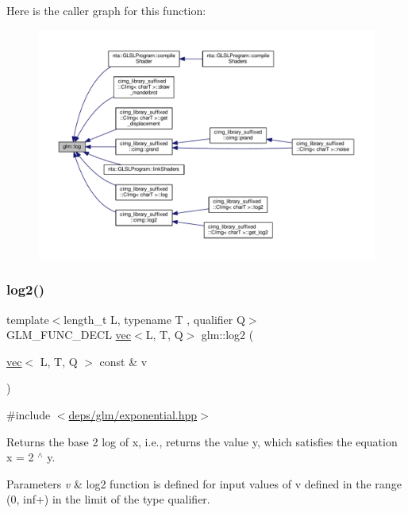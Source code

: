 Here is the caller graph for this function\+:
\nopagebreak
\begin{figure}[H]
\begin{center}
\leavevmode
\includegraphics[width=350pt]{df/d74/group__core__func__exponential_ga918c9f3fd086ce20e6760c903bd30fa9_icgraph}
\end{center}
\end{figure}
\mbox{\label{group__core__func__exponential_ga82831c7d9cca777cebedfe03a19c8d75}} 
\subsubsection{\texorpdfstring{log2()}{log2()}}
{\footnotesize\ttfamily template$<$length\+\_\+t L, typename T , qualifier Q$>$ \\
G\+L\+M\+\_\+\+F\+U\+N\+C\+\_\+\+D\+E\+CL \hyperlink{structglm_1_1vec}{vec}$<$L, T, Q$>$ glm\+::log2 (\begin{DoxyParamCaption}\item[{\hyperlink{structglm_1_1vec}{vec}$<$ L, T, Q $>$ const \&}]{v }\end{DoxyParamCaption})}



{\ttfamily \#include $<$\hyperlink{exponential_8hpp}{deps/glm/exponential.\+hpp}$>$}

Returns the base 2 log of x, i.\+e., returns the value y, which satisfies the equation x = 2 $^\wedge$ y.


\begin{DoxyParams}{Parameters}
{\em v} & log2 function is defined for input values of v defined in the range (0, inf+) in the limit of the type qualifier. \\
\hline
\end{DoxyParams}

